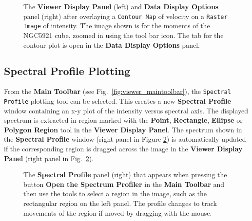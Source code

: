 \begin{figure}[h!]
\begin{center}
\caption{\label{fig:viewer_rascon} The {\bf Viewer Display Panel}
(left) and {\bf Data Display Options} panel (right) after overlaying
a {\tt Contour Map} of velocity on a {\tt Raster Image} of intensity.  The
image shown is for the moments of the NGC5921 cube, zoomed in using the tool bar icon.
The tab for the contour plot is open in the {\bf Data Display Options} 
panel.} 
\hrulefill
\end{center}
\end{figure}

\subsection{Spectral Profile Plotting}
\label{section:display.image.specprof}
From the {\bf Main Toolbar} (see Fig.~\ref{fig:viewer_maintoolbar}),
the {\tt Spectral Profile} plotting tool can be selected.
This creates a new {\bf Spectral Profile} window containing an x-y plot
of the intensity versus spectral axis. The displayed spectrum is extracted in
region marked with the {\bf Point}, {\bf Rectangle}, {\bf Ellipse} or 
{\bf Polygon Region} tool in the {\bf Viewer Display Panel}. The spectrum
shown in the {\bf Spectral Profile} window (right panel in Figure 
\ref{fig:viewer_specprof}) is automatically updated if the corresponding
region is dragged across the image in the {\bf Viewer Display Panel}
(right panel in Fig.~\ref{fig:viewer_specprof}).

\begin{figure}[h!]
\begin{center}
\caption{\label{fig:viewer_specprof} The {\bf Spectral Profile} panel (right)
that appears when pressing the button {\bf Open the Spectrum Profiler} in the
{\bf Main Toolbar} and then use the tools to select a region in the image,
such as the rectangular region on the left panel. The profile changes to
track movements of the region if moved by dragging with
the mouse.} 
\hrulefill
\end{center}
\end{figure}
